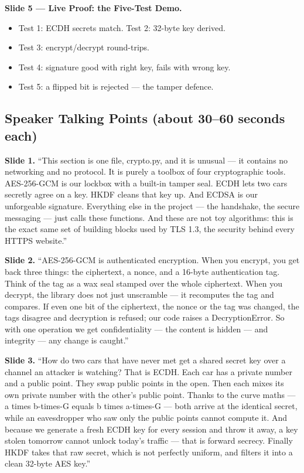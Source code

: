 \documentclass[11pt,a4paper]{article}
\begin{document}
\textbf{Slide 5 --- Live Proof: the Five-Test Demo.}
\begin{itemize}
  \item Test 1: ECDH secrets match. Test 2: 32-byte key derived.
  \item Test 3: encrypt/decrypt round-trips.
  \item Test 4: signature good with right key, fails with wrong key.
  \item Test 5: a flipped bit is rejected --- the tamper defence.
\end{itemize}

\subsection{Speaker Talking Points (about 30--60 seconds each)}

\textbf{Slide 1.} ``This section is one file, crypto.py, and it is unusual ---
it contains no networking and no protocol. It is purely a toolbox of four
cryptographic tools. AES-256-GCM is our lockbox with a built-in tamper seal. ECDH
lets two cars secretly agree on a key. HKDF cleans that key up. And ECDSA is our
unforgeable signature. Everything else in the project --- the handshake, the
secure messaging --- just calls these functions. And these are not toy
algorithms: this is the exact same set of building blocks used by TLS 1.3, the
security behind every HTTPS website.''

\textbf{Slide 2.} ``AES-256-GCM is authenticated encryption. When you encrypt,
you get back three things: the ciphertext, a nonce, and a 16-byte authentication
tag. Think of the tag as a wax seal stamped over the whole ciphertext. When you
decrypt, the library does not just unscramble --- it recomputes the tag and
compares. If even one bit of the ciphertext, the nonce or the tag was changed,
the tags disagree and decryption is refused; our code raises a DecryptionError.
So with one operation we get confidentiality --- the content is hidden --- and
integrity --- any change is caught.''

\textbf{Slide 3.} ``How do two cars that have never met get a shared secret key
over a channel an attacker is watching? That is ECDH. Each car has a private
number and a public point. They swap public points in the open. Then each mixes
its own private number with the other's public point. Thanks to the curve maths
--- a times b-times-G equals b times a-times-G --- both arrive at the identical
secret, while an eavesdropper who saw only the public points cannot compute it.
And because we generate a fresh ECDH key for every session and throw it away, a
key stolen tomorrow cannot unlock today's traffic --- that is forward secrecy.
Finally HKDF takes that raw secret, which is not perfectly uniform, and filters
it into a clean 32-byte AES key.''
\end{document}
